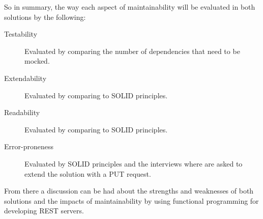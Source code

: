 So in summary, the way each aspect of maintainability will be evaluated in both
solutions by the following:

\begin{description}
    \item [Testability] Evaluated by comparing the number of dependencies that
    need to be mocked. 
    \item [Extendability] Evaluated by comparing to SOLID principles.
    \item [Readability] Evaluated by comparing to SOLID principles.
    \item [Error-proneness] Evaluated by SOLID principles and the interviews
        where are asked to extend the solution with a PUT request.
\end{description}

From there a discussion can be had about the strengths and weaknesses of both
solutions and the impacts of maintainability by using functional programming for
developing REST servers.





